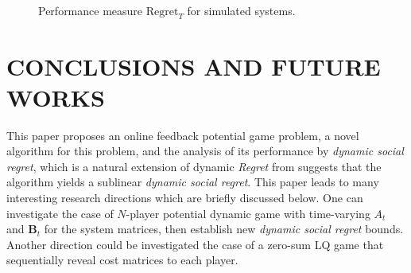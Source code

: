 \documentclass[letterpaper, 10 pt, conference]{ieeeconf}  %
\begin{document}
\begin{figure}
        \label{fig:experiments}
     \centering
    \\
    \caption{Performance measure $\text{Regret}_{T}$ for simulated systems.}
\end{figure}

\section{CONCLUSIONS AND FUTURE WORKS}\label{sec:conclusions}
This paper proposes an online feedback potential game problem, a novel algorithm for this problem, and the analysis of its performance by \emph{dynamic social regret}, which is a natural extension of dynamic \emph{Regret} from \cite[Equation (5)]{chen_regret_2023} suggests that the algorithm yields a sublinear \emph{dynamic social regret}. This paper leads to many interesting research directions which are briefly discussed below. One can investigate the case of $N$-player potential dynamic game with time-varying $A_{t}$ and $\mathbf{B}_{t}$ for the system matrices, then establish new \emph{dynamic social regret} bounds. Another direction could be investigated the case of a zero-sum LQ game that sequentially reveal cost matrices to each player.
\end{document}
